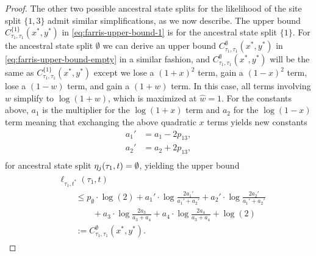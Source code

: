\begin{proof}
The other two possible ancestral state splits for the likelihood of the site split $\{1,3\}$ admit similar simplifications, as we now describe.
The upper bound $C^{\{1\}}_{\tau_1,\tau_1}(x^*, y^*)$ in \eqref{eq:farris-upper-bound-1} is for the ancestral state split $\{1\}$.
For the ancestral state split $\emptyset$ we can derive an upper bound $C^{\emptyset}_{\tau_1,\tau_1}(x^*, y^*)$ in \eqref{eq:farris-upper-bound-empty} in a similar fashion, and $C^{\emptyset}_{\tau_1,\tau_1}(x^*, y^*)$ will be the same as $C^{\{1\}}_{\tau_1,\tau_1}(x^*, y^*)$ except we lose a $(1+x)^2$ term, gain a $(1-x)^2$ term, lose a $(1-w)$ term, and gain a $(1+w)$ term.
In this case, all terms involving $w$ simplify to $\log(1+w)$, which is maximized at $\hat{w}=1$.
For the constants above, $a_{1}$ is the multiplier for the $\log(1+x)$ term and $a_{2}$ for the $\log(1-x)$ term meaning that exchanging the above quadratic $x$ terms yields new constants
\begin{equation}
    \begin{aligned}
        a_{1}' &= a_{1}-2p_{13}, \\
        a_{2}' &= a_{2}+2p_{13}, \\
    \end{aligned}
    \label{eq:a_const_prime_x}
\end{equation}
for ancestral state split $\eta_j(\tau_1, t) = \emptyset$, yielding the upper bound
\begin{align}
\begin{split}
&    \ell_{\tau_1,t^*}(\tau_1, t) \\
&\qquad\le      p_{\emptyset}  \cdot\log(2)
+ a_{1}'\cdot\log\frac{2a_{1}'}{a_{1}'+a_{2}'}
+ a_{2}'\cdot\log\frac{2a_{2}'}{a_{1}'+a_{2}'} \\
&\qquad\qquad + a_{3}\cdot\log\frac{2a_{3}}{a_{3}+a_{4}}
+ a_{4}\cdot\log\frac{2a_{4}}{a_{3}+a_{4}}
+ \log(2) \\
&\qquad := C^{\emptyset}_{\tau_1,\tau_1}(x^*, y^*).
\end{split}
\label{eq:farris-upper-bound-empty}
\end{align}


\end{proof}
